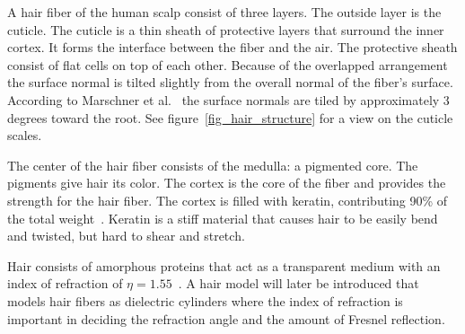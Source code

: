 \documentclass[11pt,a4paper]{report}
\begin{document}
A hair fiber of the human scalp consist of three layers. The outside layer is the cuticle. The cuticle is a thin sheath of protective layers that surround the inner cortex. It forms the interface between the fiber and the air. The protective sheath consist of flat cells on top of each other. Because of the overlapped arrangement the surface normal is tilted slightly from the overall normal of the fiber's surface. According to Marschner et al.~\cite{marschner} the surface normals are tiled by approximately 3 degrees toward the root. See figure~\ref{fig_hair_structure} for a view on the cuticle scales.

The center of the hair fiber consists of the medulla: a pigmented core. The pigments give hair its color. The cortex is the core of the fiber and provides the strength for the hair fiber. The cortex is filled with keratin, contributing 90\% of the total weight~\cite{ward}. Keratin is a stiff material that causes hair to be easily bend and twisted, but hard to shear and stretch.

Hair consists of amorphous proteins that act as a transparent medium with an index of refraction of $\eta = 1.55$~\cite{ward}. A hair model will later be introduced that models hair fibers as dielectric cylinders where the index of refraction is important in deciding the refraction angle and the amount of Fresnel reflection.
\end{document}
